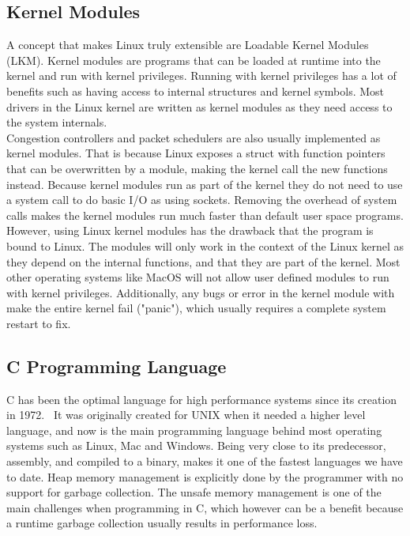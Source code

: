 \documentclass[a4paper,english, 11pt]{report}
\begin{document}
\subsection{Kernel Modules}
A concept that makes Linux truly extensible are Loadable Kernel Modules (LKM). Kernel modules are programs that can be loaded at runtime into the kernel and run with kernel privileges. Running with kernel privileges has a lot of benefits such as having access to internal structures and kernel symbols. Most drivers in the Linux kernel are written as kernel modules as they need access to the system internals.\\

Congestion controllers and packet schedulers are also usually implemented as kernel modules. That is because Linux exposes a struct with function pointers that can be overwritten by a module, making the kernel call the new functions instead. Because kernel modules run as part of the kernel they do not need to use a system call to do basic I/O as using sockets. Removing the overhead of system calls makes the kernel modules run much faster than default user space programs.\\

However, using Linux kernel modules has the drawback that the program is bound to Linux. The modules will only work in the context of the Linux kernel as they depend on the internal functions, and that they are part of the kernel. Most other operating systems like MacOS will not allow user defined modules to run with kernel privileges. Additionally, any bugs or error in the kernel module with make the entire kernel fail ("panic"), which usually requires a complete system restart to fix.

\subsection{C Programming Language}
C has been the optimal language for high performance systems since its creation in 1972.~\cite{c_programming_language} It was originally created for UNIX when it needed a higher level language, and now is the main programming language behind most operating systems such as Linux, Mac and Windows. Being very close to its predecessor, assembly, and compiled to a binary, makes it one of the fastest languages we have to date. Heap memory management is explicitly done by the programmer with no support for garbage collection. The unsafe memory management is one of the main challenges when programming in C, which however can be a benefit because a runtime garbage collection usually results in performance loss.
\end{document}
